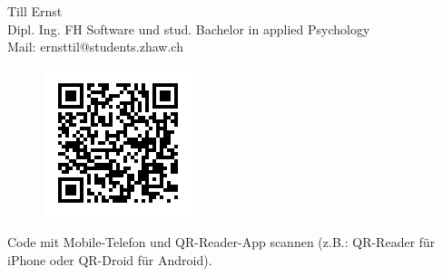 Till Ernst\\
Dipl. Ing. FH Software und stud. Bachelor in applied Psychology\\
Mail: ernsttil@students.zhaw.ch\\
\begin{figure}
    \centering
    \includegraphics[scale=0.5]{images/anhang/umfrage_qr_code.png}
\end{figure}
Code mit Mobile-Telefon und QR-Reader-App scannen (z.B.: QR-Reader für iPhone oder QR-Droid für Android).

